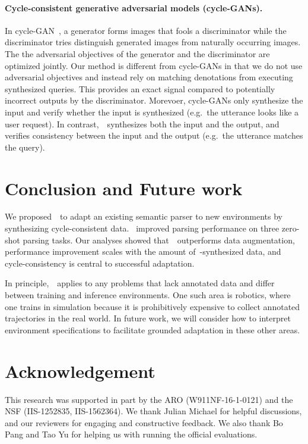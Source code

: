 \documentclass[11pt,a4paper]{article}
\begin{document}
\paragraph{Cycle-consistent generative adversarial models (cycle-GANs).}
In cycle-GAN~\citep{Zhu2017CycleGAN,Hoffman2017cycada}, a generator forms images that fools a discriminator while the discriminator tries distinguish generated images from naturally occurring images.
The the adversarial objectives of the generator and the discriminator are optimized jointly.
Our method is different from cycle-GANs in that we do not use adversarial objectives and instead rely on matching denotations from executing synthesized queries.
This provides an exact signal compared to potentially incorrect outputs by the discriminator.
Morevoer, cycle-GANs only synthesize the input and verify whether the input is synthesized (e.g.~the utterance looks like a user request).
In contrast,~\modelnameshort~synthesizes both the input and the output, and verifies consistency between the input and the output (e.g.~the utterance matches the query).



\section{Conclusion and Future work}

We proposed~\modelnameshort~to adapt an existing semantic parser to new environments by synthesizing cycle-consistent data.
\modelnameshort~improved parsing performance on three zero-shot parsing tasks.
Our analyses showed that~\modelnameshort~outperforms data augmentation, performance improvement scales with the amount of~\modelnameshort-synthesized data, and cycle-consistency is central to successful adaptation.

In principle,~\modelnameshort~applies to any problems that lack annotated data and differ between training and inference environments.
One such area is robotics, where one trains in simulation because it is prohibitively expensive to collect annotated trajectories in the real world.
In future work, we will consider how to interpret environment specifications to facilitate grounded adaptation in these other areas.



\section*{Acknowledgement}
This research was supported in part by the ARO (W911NF-16-1-0121) and the NSF (IIS-1252835, IIS-1562364).
We thank Julian Michael for helpful discussions, and our reviewers for engaging and constructive feedback.
We also thank Bo Pang and Tao Yu for helping us with running the official evaluations.
\end{document}
